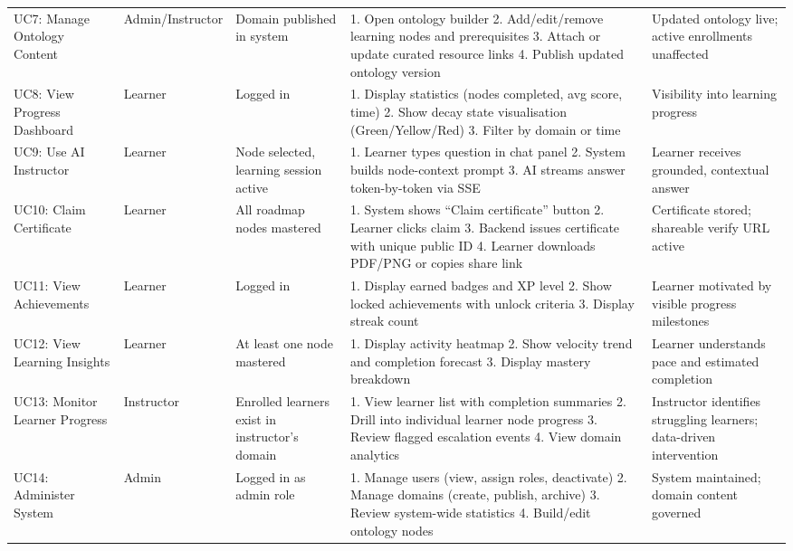 \begin{table}[htbp]
\begin{tabular}{@{}p{2cm}p{1.8cm}p{2.5cm}p{5.5cm}p{2.7cm}@{}}
        UC7: Manage Ontology Content & Admin/Instructor & Domain published in system & 1. Open ontology builder 2. Add/edit/remove learning nodes and prerequisites 3. Attach or update curated resource links 4. Publish updated ontology version & Updated ontology live; active enrollments unaffected \\
        UC8: View Progress Dashboard & Learner & Logged in & 1. Display statistics (nodes completed, avg score, time) 2. Show decay state visualisation (Green/Yellow/Red) 3. Filter by domain or time & Visibility into learning progress \\
        UC9: Use AI Instructor & Learner & Node selected, learning session active & 1. Learner types question in chat panel 2. System builds node-context prompt 3. AI streams answer token-by-token via SSE & Learner receives grounded, contextual answer \\
        UC10: Claim Certificate & Learner & All roadmap nodes mastered & 1. System shows ``Claim certificate'' button 2. Learner clicks claim 3. Backend issues certificate with unique public ID 4. Learner downloads PDF/PNG or copies share link & Certificate stored; shareable verify URL active \\
        UC11: View Achievements & Learner & Logged in & 1. Display earned badges and XP level 2. Show locked achievements with unlock criteria 3. Display streak count & Learner motivated by visible progress milestones \\
        UC12: View Learning Insights & Learner & At least one node mastered & 1. Display activity heatmap 2. Show velocity trend and completion forecast 3. Display mastery breakdown & Learner understands pace and estimated completion \\
        UC13: Monitor Learner Progress & Instructor & Enrolled learners exist in instructor's domain & 1. View learner list with completion summaries 2. Drill into individual learner node progress 3. Review flagged escalation events 4. View domain analytics & Instructor identifies struggling learners; data-driven intervention \\
        UC14: Administer System & Admin & Logged in as admin role & 1. Manage users (view, assign roles, deactivate) 2. Manage domains (create, publish, archive) 3. Review system-wide statistics 4. Build/edit ontology nodes & System maintained; domain content governed \\
        \bottomrule
    \end{tabular}
\end{table}

